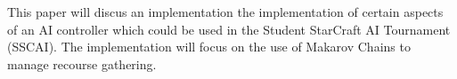 This paper will discus an implementation the implementation of certain aspects of an AI controller which could be used in the Student StarCraft AI Tournament (SSCAI). The implementation will focus on the use of Makarov Chains to manage recourse gathering.